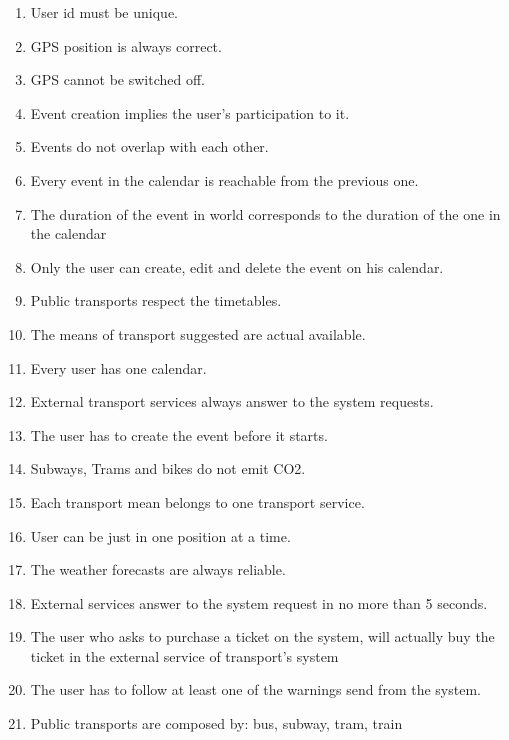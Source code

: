\begin{enumerate}
	\setlength{\leftskip}{1cm}
	\item User id must be unique.
	\item GPS position is always correct.
	\item GPS cannot be switched off.
	\item Event creation implies the user’s participation to it.
	\item Events do not overlap with each other.
	\item Every event in the calendar is reachable from the previous one.
	\item The duration of the event in world corresponds to the duration of the one in the calendar
	\item Only the user can create, edit and delete the event on his calendar.
	\item Public transports respect the timetables.
	\item The means of transport suggested are actual available.
	\item Every user has one calendar.
	\item External transport services always answer to the system requests.
	\item The user has to create the event before it starts.
	\item Subways, Trams and bikes do not emit CO2.
	\item Each transport mean belongs to one transport service.
	\item User can be just in one position at a time.
	\item The weather forecasts are always reliable.
	\item External services answer to the system request in no more than 5 seconds.
	\item The user who asks to purchase a ticket on the system, will actually buy the ticket in the external service of transport’s system
	\item The user has to follow at least one of the warnings send from the system.
	\item Public transports are composed by: bus, subway, tram, train
\end{enumerate}